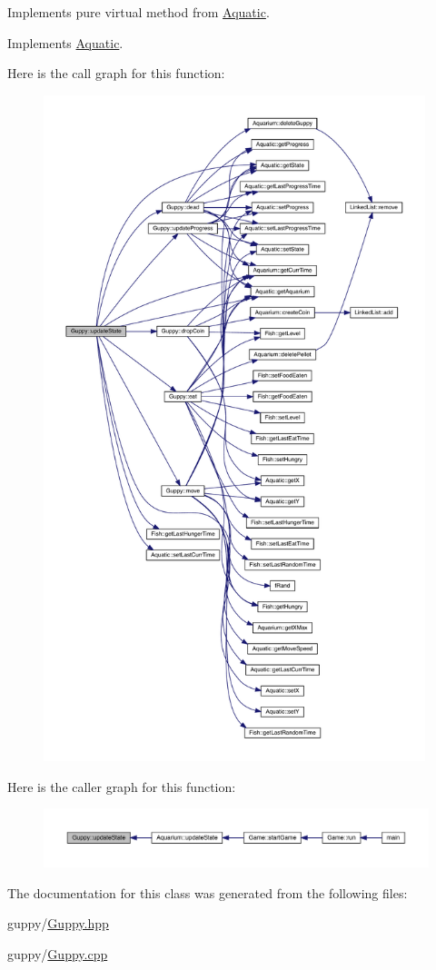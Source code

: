 Implements pure virtual method from \mbox{\hyperlink{class_aquatic}{Aquatic}}. 



Implements \mbox{\hyperlink{class_aquatic_a51e44c95476d72a841fea667c6cbbedc}{Aquatic}}.

Here is the call graph for this function\+:\nopagebreak
\begin{figure}[H]
\begin{center}
\leavevmode
\includegraphics[height=550pt]{class_guppy_ac62ef7053d40430ad98c1d5a54699f9d_cgraph}
\end{center}
\end{figure}
Here is the caller graph for this function\+:\nopagebreak
\begin{figure}[H]
\begin{center}
\leavevmode
\includegraphics[width=350pt]{class_guppy_ac62ef7053d40430ad98c1d5a54699f9d_icgraph}
\end{center}
\end{figure}


The documentation for this class was generated from the following files\+:\begin{DoxyCompactItemize}
\item 
guppy/\mbox{\hyperlink{_guppy_8hpp}{Guppy.\+hpp}}\item 
guppy/\mbox{\hyperlink{_guppy_8cpp}{Guppy.\+cpp}}\end{DoxyCompactItemize}
